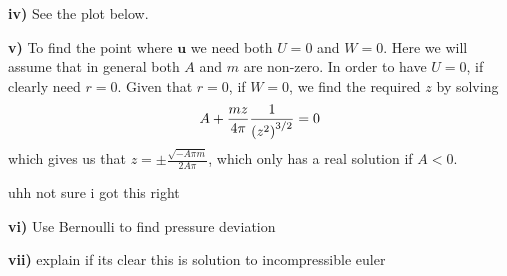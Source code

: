 \documentclass{article}
\def\*#1{\mathbf{#1}}
\begin{document}
\textbf{iv)} See the plot below.

\textbf{v)} To find the point where $\*u$ we need both $U = 0$ and $W =
0$. Here we will assume that in general both $A$ and $m$ are non-zero.
In order to have $U = 0$, if clearly need $r = 0$. Given that $r = 0$, if
$W = 0$, we find the required $z$ by solving
%
\begin{equation*}
    A + \frac{m z}{4 \pi} \frac{1}{\del{z^2}^{3/2}} = 0
\end{equation*}
%
which gives us that $z = \pm \frac{\sqrt{- A \pi m}}{2 A \pi}$, which
only has a real solution if $A < 0$.

uhh not sure i got this right

\textbf{vi)} Use Bernoulli to find pressure deviation

\textbf{vii)} explain if its clear this is solution to incompressible euler
\end{document}
